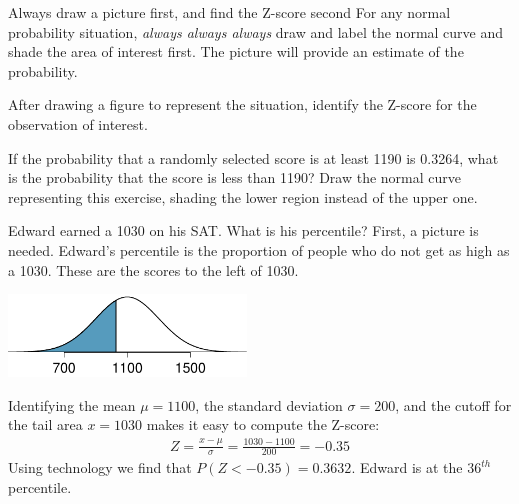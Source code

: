 \begin{onebox}{Always draw a picture first, and find the Z-score second}
For any normal probability situation, \emph{always always always} draw and label the normal curve and shade the area of interest first. The picture will provide an estimate of the probability. \vspace{3mm}

After drawing a figure to represent the situation, identify the Z-score for the observation of interest.\vspace{1mm}\end{onebox}

\begin{exercisewrap}
\begin{nexercise}
If the probability that a randomly selected score is at least 1190 is 0.3264, what is the probability that the score is less than 1190? Draw the normal curve representing this exercise, shading the lower region instead of the upper one.\footnotemark
\end{nexercise}
\end{exercisewrap}

\B{\newpage}

\begin{examplewrap}
\begin{nexample}{Edward earned a 1030 on his SAT. What is his percentile?} \label{edwardSatBelow1030}
First, a picture is needed. Edward's percentile is the proportion of people who do not get as high as a 1030. These are the scores to the left of 1030.
\begin{center}
\includegraphics[height=22mm]{ch_distributions/figures/satBelow1030/satBelow1030}
\end{center}
Identifying the mean $\mu=1100$, the standard deviation $\sigma=200$, and the cutoff for the tail area $x=1030$ makes it easy to compute the Z-score:
\begin{eqnarray*}
Z = \frac{x - \mu}{\sigma} = \frac{1030 - 1100}{200} = -0.35
\end{eqnarray*}
Using technology we find that $P(Z < -0.35) = 0.3632$. Edward is at the $36^{th}$ percentile.
\end{nexample}
\end{examplewrap}

